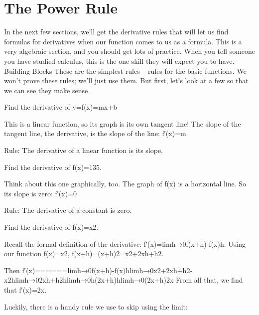 \section{The Power Rule}
\label{sec:power}

In the next few sections, we’ll get the derivative rules that will let us find formulas for derivatives when our function comes to us as a formula. This is a very algebraic section, and you should get lots of practice. When you tell someone you have studied calculus, this is the one skill they will expect you to have.
Building Blocks
These are the simplest rules – rules for the basic functions. We won't prove these rules; we'll just use them. But first, let's look at a few so that we can see they make sense.

\begin{example}
Find the derivative of y=f(x)=mx+b
\begin{solution} This is a linear function, so its graph is its own tangent line! The slope of the tangent line, the derivative, is the slope of the line:
f′(x)=m
\end{solution}\end{example}
Rule:
The derivative of a linear function is its slope.

\begin{example}
Find the derivative of f(x)=135.

\begin{solution} Think about this one graphically, too. The graph of f(x) is a horizontal line. So its slope is zero:
f′(x)=0
\end{solution}\end{example}
Rule:
The derivative of a constant is zero.

\begin{example}
Find the derivative of f(x)=x2.

\begin{solution} Recall the formal definition of the derivative:
f′(x)=limh→0f(x+h)-f(x)h.
Using our function f(x)=x2, f(x+h)=(x+h)2=x2+2xh+h2.

Then
f′(x)======limh→0f(x+h)-f(x)hlimh→0x2+2xh+h2-x2hlimh→02xh+h2hlimh→0h(2x+h)hlimh→0(2x+h)2x
From all that, we find that f′(x)=2x.
\end{solution}\end{example}

Luckily, there is a handy rule we use to skip using the limit:

